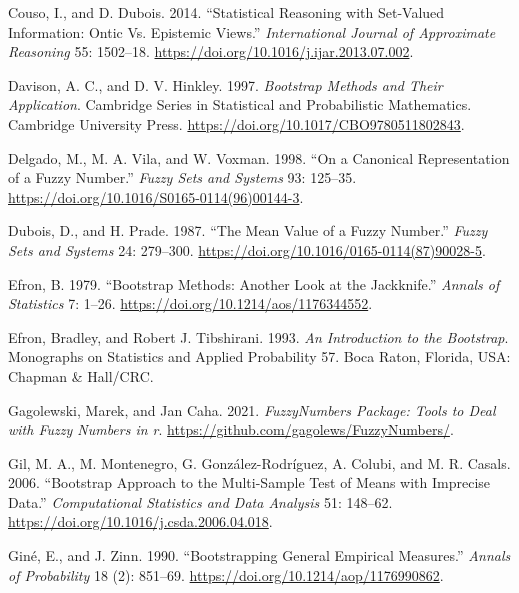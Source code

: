 \begin{CSLReferences}{1}{0}
\leavevmode{}%
Couso, I., and D. Dubois. 2014. {``Statistical Reasoning with Set-Valued Information: Ontic Vs. Epistemic Views.''} \emph{International Journal of Approximate Reasoning} 55: 1502--18. \url{https://doi.org/10.1016/j.ijar.2013.07.002}.

\leavevmode{}%
Davison, A. C., and D. V. Hinkley. 1997. \emph{Bootstrap Methods and Their Application}. Cambridge Series in Statistical and Probabilistic Mathematics. Cambridge University Press. \url{https://doi.org/10.1017/CBO9780511802843}.

\leavevmode{}%
Delgado, M., M. A. Vila, and W. Voxman. 1998. {``On a Canonical Representation of a Fuzzy Number.''} \emph{Fuzzy Sets and Systems} 93: 125--35. \url{https://doi.org/10.1016/S0165-0114(96)00144-3}.

\leavevmode{}%
Dubois, D., and H. Prade. 1987. {``The Mean Value of a Fuzzy Number.''} \emph{Fuzzy Sets and Systems} 24: 279--300. \url{https://doi.org/10.1016/0165-0114(87)90028-5}.

\leavevmode{}%
Efron, B. 1979. {``Bootstrap Methods: Another Look at the Jackknife.''} \emph{Annals of Statistics} 7: 1--26. \url{https://doi.org/10.1214/aos/1176344552}.

\leavevmode{}%
Efron, Bradley, and Robert J. Tibshirani. 1993. \emph{An Introduction to the Bootstrap}. Monographs on Statistics and Applied Probability 57. Boca Raton, Florida, USA: Chapman \& Hall/CRC.

\leavevmode{}%
Gagolewski, Marek, and Jan Caha. 2021. \emph{FuzzyNumbers Package: Tools to Deal with Fuzzy Numbers in r}. \url{https://github.com/gagolews/FuzzyNumbers/}.

\leavevmode{}%
Gil, M. A., M. Montenegro, G. González-Rodríguez, A. Colubi, and M. R. Casals. 2006. {``Bootstrap Approach to the Multi-Sample Test of Means with Imprecise Data.''} \emph{Computational Statistics and Data Analysis} 51: 148--62. \url{https://doi.org/10.1016/j.csda.2006.04.018}.

\leavevmode{}%
Giné, E., and J. Zinn. 1990. {``Bootstrapping General Empirical Measures.''} \emph{Annals of Probability} 18 (2): 851--69. \url{https://doi.org/10.1214/aop/1176990862}.


\end{CSLReferences}
